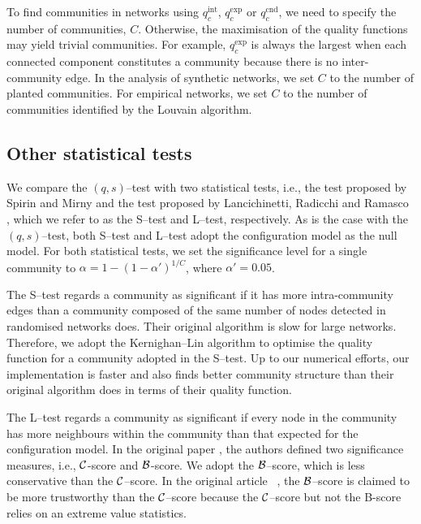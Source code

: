 \documentclass[fleqn,10pt]{wlscirep}
\def\qint{q^{\text{int}}}
\def\qexp{q^{\text{exp}}}
\def\qcnd{q^{\text{cnd}}}
\begin{document}
To find communities in networks using $\qint_c$, $\qexp_c$ or $\qcnd_c$, we need to specify the number of communities, $C$.
Otherwise, the maximisation of the quality functions may yield trivial communities. 
For example, $\qexp_c$ is always the largest when each connected component constitutes a community because there is no inter-community edge. 
In the analysis of synthetic networks, we set $C$ to the number of planted communities. 
For empirical networks, we set $C$ to the number of communities identified by the Louvain algorithm.
 
\subsection{Other statistical tests} 
We compare the $(q,s)$--test with two statistical tests, i.e., the test proposed by Spirin and Mirny \cite{Spirin2003} and the test proposed by Lancichinetti, Radicchi and Ramasco \cite{Lancichinetti2010}, which we refer to as the S--test and L--test, respectively.
As is the case with the $(q,s)$--test, both S--test and L--test adopt the configuration model as the null model. 
For both statistical tests, we set the significance level for a single community to $\alpha = 1 - (1-\alpha')^{1/C}$, where $\alpha' = 0.05$. 

The S--test regards a community as significant if it has more intra-community edges than a community composed of the same number of nodes detected in randomised networks does.
Their original algorithm \cite{Spirin2003} is slow for large networks.
Therefore, we adopt the Kernighan--Lin algorithm \cite{Kernighan1970} to optimise the quality function for a community adopted in the S--test. 
Up to our numerical efforts, our implementation is faster and also finds better community structure than their original algorithm does in terms of their quality function. 
  
The L--test regards a community as significant if every node in the community has more neighbours within the community than that expected for the configuration model.
In the original paper \cite{Lancichinetti2010}, the authors defined two significance measures, i.e., ${\cal C}$-score and ${\cal B}$-score.
We adopt the ${\cal B}$--score, which is less conservative than the ${\cal C}$--score.
In the original article ~\cite{Lancichinetti2010}, the ${\cal B}$--score is claimed to be more trustworthy than the ${\cal C}$--score because 
the ${\cal C}$--score but not the B-score relies on an extreme value statistics.
\end{document}
